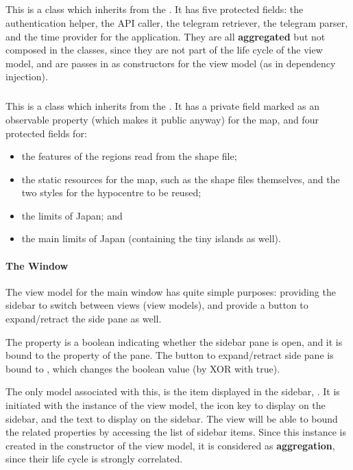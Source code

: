\subparagraph{}

This is a class which inherits from the . It has five protected fields: the authentication helper, the API caller, the telegram retriever, the telegram parser, and the time provider for the application. They are all \textbf{aggregated} but not composed in the classes, since they are not part of the life cycle of the view model, and are passes in as constructors for the view model (as in dependency injection).

\subparagraph{}

This is a class which inherits from the . It has a private field marked as an observable property (which makes it public anyway) for the map, and four protected fields for:
\begin{itemize}
    \item the features of the regions read from the shape file;
    \item the static resources for the map, such as the shape files themselves, and the two styles for the hypocentre to be reused;
    \item the limits of Japan; and
    \item the main limits of Japan (containing the tiny islands as well).
\end{itemize}

\paragraph{The Window}

The view model for the main window has quite simple purposes: providing the sidebar to switch between views (view models), and provide a button to expand/retract the side pane as well.

The property  is a boolean indicating whether the sidebar pane is open, and it is bound to the property of the pane. The button to expand/retract side pane is bound to , which changes the boolean value (by XOR with true).

The only model associated with this, is the item displayed in the sidebar, . It is initiated with the instance of the view model, the icon key to display on the sidebar, and the text to display on the sidebar. The view will be able to bound the related properties by accessing the list of sidebar items. Since this instance is created in the constructor of the view model, it is considered as \textbf{aggregation}, since their life cycle is strongly correlated.

